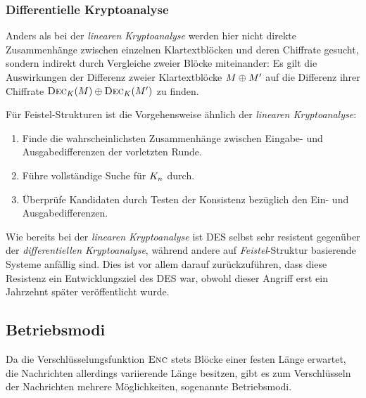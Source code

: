 \subsubsection{Differentielle Kryptoanalyse}
\label{sssec:diffKryptoanalyse}
Anders als bei der \textit{linearen Kryptoanalyse} werden hier nicht direkte Zusammenhänge zwischen einzelnen Klartextblöcken und deren Chiffrate gesucht, sondern
indirekt durch Vergleiche zweier Blöcke miteinander: Es gilt die Auswirkungen der Differenz zweier Klartextblöcke $M \oplus M'$ auf die Differenz
ihrer Chiffrate $\textsc{Dec}_{K}(M) \oplus \textsc{Dec}_{K}(M')$ zu finden.

Für Feistel-Strukturen ist die Vorgehensweise ähnlich der \textit{linearen Kryptoanalyse}:
\begin{enumerate}
	\item Finde die wahrscheinlichsten Zusammenhänge zwischen Eingabe- und Ausgabedifferenzen der vorletzten Runde.
	\item Führe vollständige Suche für $K_n$ durch.
	\item Überprüfe Kandidaten durch Testen der Konsistenz bezüglich den Ein- und Ausgabedifferenzen.
\end{enumerate}

Wie bereits bei der \textit{linearen Kryptoanalyse} ist DES selbst sehr resistent gegenüber der \textit{differentiellen Kryptoanalyse}, während andere auf \textit{Feistel}-Struktur basierende Systeme anfällig sind. Dies ist vor
allem darauf zurückzuführen, dass diese Resistenz ein Entwicklungsziel des DES war, obwohl dieser Angriff erst ein Jahrzehnt später veröffentlicht wurde.

\subsection{Betriebsmodi}
Da die Verschlüsselungsfunktion $\textsc{Enc}$ stets Blöcke einer festen Länge erwartet, die Nachrichten allerdings variierende Länge besitzen, gibt es zum Verschlüsseln der Nachrichten mehrere Möglichkeiten, sogenannte Betriebsmodi.

